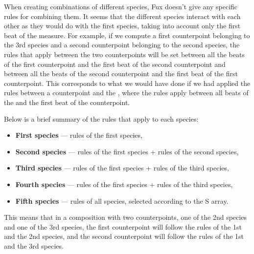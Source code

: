 When creating combinations of different species, Fux doesn't give any specific rules for combining them. It seems that the different species interact with each other as they would do with the first species, taking into account only the first beat of the measure. For example, if we compute a first counterpoint belonging to the 3rd species and a second counterpoint belonging to the second species, the rules that apply between the two counterpoints will be set between all the beats of the first counterpoint and the first beat of the second counterpoint and between all the beats of the second counterpoint and the first beat of the first counterpoint. This corresponds to what we would have done if we had applied the rules between a counterpoint and the \cf, where the rules apply between all beats of the \cfs and the first beat of the counterpoint.

Below is a brief summary of the rules that apply to each species:
\begin{itemize}
    \item \textbf{First species} --- rules of the first species,
    \item \textbf{Second species} --- rules of the first species + rules of the second species,
    \item \textbf{Third species} --- rules of the first species + rules of the third species,
    \item \textbf{Fourth species} --- rules of the first species + rules of the third species,
    \item \textbf{Fifth species} --- rules of all species, selected according to the S array.
\end{itemize}
This means that in a composition with two counterpoints, one of the 2nd species and one of the 3rd species, the first counterpoint will follow the rules of the 1st and the 2nd species, and the second counterpoint will follow the rules of the 1st and the 3rd species.